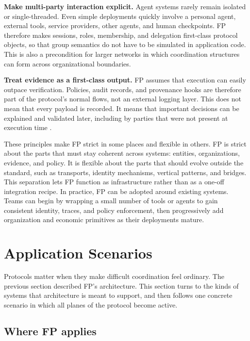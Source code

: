 \documentclass{llmxive}
\begin{document}
\textbf{Make multi-party interaction explicit.} Agent systems rarely remain isolated or single-threaded. Even simple deployments quickly involve a personal agent, external tools, service providers, other agents, and human checkpoints. FP therefore makes sessions, roles, membership, and delegation first-class protocol objects, so that group semantics do not have to be simulated in application code. This is also a precondition for larger networks in which coordination structures can form across organizational boundaries.

\textbf{Treat evidence as a first-class output.} FP assumes that execution can easily outpace verification. Policies, audit records, and provenance hooks are therefore part of the protocol's normal flows, not an external logging layer. This does not mean that every payload is recorded. It means that important decisions can be explained and validated later, including by parties that were not present at execution time \cite{agi_economics}.

These principles make FP strict in some places and flexible in others. FP is strict about the parts that must stay coherent across systems: entities, organizations, evidence, and policy. It is flexible about the parts that should evolve outside the standard, such as transports, identity mechanisms, vertical patterns, and bridges. This separation lets FP function as infrastructure rather than as a one-off integration recipe.
In practice, FP can be adopted around existing systems. Teams can begin by wrapping a small number of tools or agents to gain consistent identity, traces, and policy enforcement, then progressively add organization and economic primitives as their deployments mature.


\section{Application Scenarios}
\label{sec:scenarios}

Protocols matter when they make difficult coordination feel ordinary. The previous section described FP's architecture. This section turns to the kinds of systems that architecture is meant to support, and then follows one concrete scenario in which all planes of the protocol become active.

\subsection{Where FP applies}
\label{subsec:scenario-overview}
\end{document}
